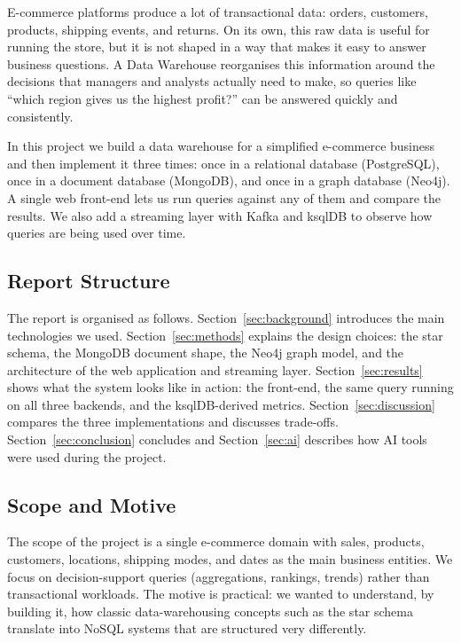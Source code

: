 \documentclass[11pt,a4paper]{article}
\begin{document}
E-commerce platforms produce a lot of transactional data: orders, customers,
products, shipping events, and returns. On its own, this raw data is useful
for running the store, but it is not shaped in a way that makes it easy to
answer business questions. A Data Warehouse reorganises this information
around the decisions that managers and analysts actually need to make, so
queries like ``which region gives us the highest profit?'' can be answered
quickly and consistently.

In this project we build a data warehouse for a simplified e-commerce
business and then implement it three times: once in a relational database
(PostgreSQL), once in a document database (MongoDB), and once in a graph
database (Neo4j). A single web front-end lets us run queries against any of
them and compare the results. We also add a streaming layer with Kafka and
ksqlDB to observe how queries are being used over time.

\subsection{Report Structure}

The report is organised as follows. Section~\ref{sec:background} introduces
the main technologies we used. Section~\ref{sec:methods} explains the design
choices: the star schema, the MongoDB document shape, the Neo4j graph model,
and the architecture of the web application and streaming layer.
Section~\ref{sec:results} shows what the system looks like in action: the
front-end, the same query running on all three backends, and the
ksqlDB-derived metrics. Section~\ref{sec:discussion} compares the three
implementations and discusses trade-offs. Section~\ref{sec:conclusion}
concludes and Section~\ref{sec:ai} describes how AI tools were used during
the project.

\subsection{Scope and Motive}

The scope of the project is a single e-commerce domain with sales, products,
customers, locations, shipping modes, and dates as the main business
entities. We focus on decision-support queries (aggregations, rankings,
trends) rather than transactional workloads. The motive is practical: we
wanted to understand, by building it, how classic data-warehousing concepts
such as the star schema translate into NoSQL systems that are structured
very differently.
\end{document}
